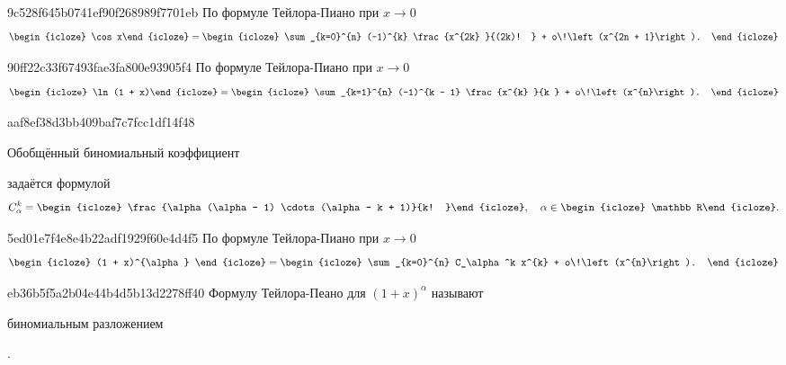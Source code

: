 \begin{note}{9c528f645b0741ef90f268989f7701eb}
    По формуле Тейлора-Пиано при \( x \to 0 \)
    \[
        \begin{icloze}{2}\cos x\end{icloze} = \begin{icloze}{1}\sum_{k=0}^{n} (-1)^{k} \frac{x^{2k} }{(2k)! } + o\!\left(x^{2n + 1}\right). \end{icloze}
    \]
\end{note}

\begin{note}{90ff22c33f67493fae3fa800e93905f4}
    По формуле Тейлора-Пиано при \( x \to 0 \)
    \[
        \begin{icloze}{2}\ln (1 + x)\end{icloze} = \begin{icloze}{1}\sum_{k=1}^{n} (-1)^{k - 1} \frac{x^{k} }{k } + o\!\left(x^{n}\right). \end{icloze}
    \]
\end{note}

\begin{note}{aaf8ef38d3bb409baf7c7fcc1df14f48}
    \begin{icloze}{3}Обобщённый биномиальный коэффициент\end{icloze} задаётся формулой
    \[
        C_\alpha^k = \begin{icloze}{1}\frac{\alpha(\alpha - 1) \cdots (\alpha - k + 1)}{k! }\end{icloze}, \quad \alpha \in \begin{icloze}{2}\mathbb R\end{icloze}.
    \]
\end{note}

\begin{note}{5ed01e7f4e8e4b22adf1929f60e4d4f5}
    По формуле Тейлора-Пиано при \( x \to 0 \)
    \[
        \begin{icloze}{2}(1 + x)^{\alpha} \end{icloze} = \begin{icloze}{1}\sum_{k=0}^{n} C_\alpha^k x^{k} + o\!\left(x^{n}\right). \end{icloze}
    \]
\end{note}

\begin{note}{eb36b5f5a2b04e44b4d5b13d2278ff40}
    Формулу Тейлора-Пеано для \( (1 + x)^{\alpha} \) называют \begin{icloze}{1}биномиальным разложением\end{icloze}.
\end{note}


